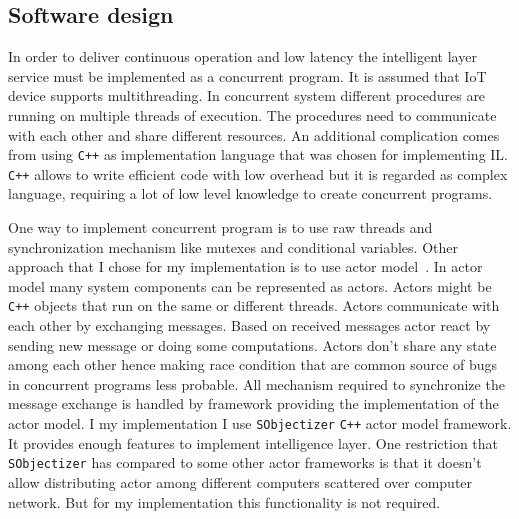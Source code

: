 \documentclass[english, 12pt, a4paper, elec, utf8, online]{aaltothesis}
\begin{document}
\subsection{Software design}
In order to deliver continuous operation and low latency the intelligent layer service must be implemented as a concurrent program. It is assumed that IoT device supports multithreading. In concurrent system different procedures are running on multiple threads of execution. The procedures need to communicate with each other and share different resources. An additional complication comes from using \texttt{C++} as implementation language that was chosen for implementing IL. \texttt{C++} allows to write efficient code with low overhead but it is regarded as complex language, requiring a lot of low level knowledge to create concurrent programs. 

One way to implement concurrent program is to use raw threads and synchronization mechanism like mutexes and conditional variables. Other approach that I chose for my implementation is to use actor model~\cite{agha1985actors}. In actor model many system components can be represented as actors. Actors might be \texttt{C++} objects that run on the same or different threads. Actors communicate with each other by exchanging messages. Based on received messages actor react by sending new message or doing some computations. Actors don't share any state among each other hence making race condition that are common source of bugs in concurrent programs less probable. All mechanism required to synchronize the message exchange is handled by framework providing the implementation of the actor model.          
I my implementation I use \texttt{SObjectizer} \texttt{C++} actor model framework. It provides enough features to implement intelligence layer. One restriction that \texttt{SObjectizer} has compared to some other actor frameworks is that it doesn't allow distributing actor among different computers scattered over computer network. But for my implementation this functionality is not required.      
     
\end{document}
